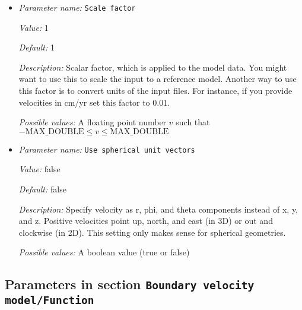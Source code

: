 \begin{itemize}
{\it Value:} 0


{\it Default:} 0


{\it Description:} Number of the first velocity file to be loaded when the model time is larger than `First velocity file model time'.


{\it Possible values:} An integer $n$ such that $-2147483648\leq n \leq 2147483647$
\item {\it Parameter name:} {\tt Scale factor}
\label{parameters:Boundary velocity model/Ascii data model/Scale factor}


{\it Value:} 1


{\it Default:} 1


{\it Description:} Scalar factor, which is applied to the model data. You might want to use this to scale the input to a reference model. Another way to use this factor is to convert units of the input files. For instance, if you provide velocities in cm/yr set this factor to 0.01.


{\it Possible values:} A floating point number $v$ such that $-\text{MAX\_DOUBLE} \leq v \leq \text{MAX\_DOUBLE}$
\item {\it Parameter name:} {\tt Use spherical unit vectors}
\label{parameters:Boundary velocity model/Ascii data model/Use spherical unit vectors}


{\it Value:} false


{\it Default:} false


{\it Description:} Specify velocity as r, phi, and theta components instead of x, y, and z. Positive velocities point up, north, and east (in 3D) or out and clockwise (in 2D). This setting only makes sense for spherical geometries.


{\it Possible values:} A boolean value (true or false)
\end{itemize}

\subsection{Parameters in section \tt Boundary velocity model/Function}
\label{parameters:Boundary_20velocity_20model/Function}

